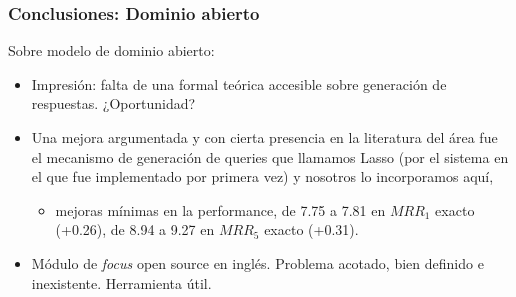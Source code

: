 \begin{frame}
\frametitle{Conclusiones: Dominio abierto}

Sobre modelo de dominio abierto:
  \begin{itemize}
 \item Impresión: falta de una  formal teórica accesible sobre generación de respuestas. ¿Oportunidad?
 \item Una mejora argumentada y con cierta presencia en la literatura del área fue el mecanismo de generación de queries que llamamos Lasso (por el sistema en el que fue implementado por primera vez) y nosotros lo incorporamos aquí, 
  \begin{itemize}
    \item  mejoras mínimas en la performance, de 7.75 a 7.81 en $MRR_1$ exacto (+0.26), de 8.94 a 9.27 en $MRR_5$ exacto (+0.31). 
  \end{itemize}
  \item Módulo de \textit{focus} open source en inglés. Problema acotado, bien definido e inexistente. Herramienta útil.
  \end{itemize}
\end{frame}
